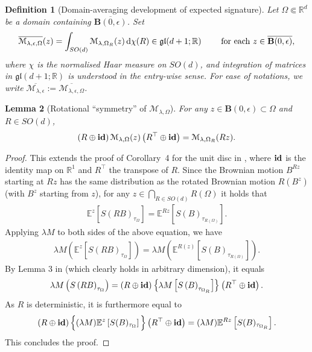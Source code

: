 \documentclass[11pt,a4paper,english,reqno]{amsart}
\theoremstyle{plain}
\newtheorem{definition}{Definition}[section]
\newtheorem{lemma}[definition]{Lemma}
\newcommand{\R}{\mathbb{R}}
\newcommand{\dd}{{\rm d}}
\newcommand{\e}{\epsilon}
\newcommand{\1}{\mathbbm{1}}
\newcommand{\B}{\mathbf{B}}
\begin{document}
\begin{definition}[Domain-averaging development of expected signature]\label{def: domain avg}
Let $\Omega\Subset \R^d$ be a domain containing $\overline{\B(0,\e)}$. Set
\begin{equation}\label{M avg}
\overline{\mathcal{M}_{\lambda,\e,\Omega}}(z) = \int_{SO(d)}\mathcal{M}_{\lambda, \Omega_{R}}(z) \,\dd\chi(R) \in \mathfrak{gl}(d+1;\R)\qquad \text{ for each } z \in \overline{\B(0,\e)},
\end{equation}
where $\chi$ is the normalised Haar measure on $SO(d)$, and integration of matrices in $\mathfrak{gl}(d+1;\R)$ is understood in the entry-wise sense. For ease of notations, we write $\overline{\mathcal{M}_{\lambda,\e}} := \overline{\mathcal{M}_{\lambda,\e,\Omega}}$.
\end{definition}



\begin{lemma}[Rotational ``symmetry'' of $\mathcal{M}_{\lambda,\Omega}$]
For any $z \in \B(0, \e)\subset \Omega$ and $R \in SO(d)$,
\begin{eqnarray}
\left(R \oplus  {\bf id}\right) \mathcal{M}_{\lambda, \Omega}(z)\left(R^{\top} \oplus {\bf id}\right) =  \mathcal{M}_{\lambda, \Omega_{R}}(Rz). \label{B}
\end{eqnarray}
\end{lemma}
\begin{proof}
This extends the proof of Corollary~4 for the unit disc in \cite{boedihardjo2021expected}, where ${\bf id}$ is the identity map on $\R^1$ and $R^\top$ the transpose of $R$. Since the Brownian motion $B^{Rz}$
starting at $Rz$ has the same distribution as the rotated Brownian motion $R (B^{z})$ (with $B^z$ starting from $z$), for any $z \in \bigcap_{R\in SO(d)}R(\Omega)$ it holds that 
\begin{eqnarray*}
\mathbb{E}^{z}\left[S\left(RB\right)_{\tau_{\Omega}}\right]= \mathbb{E}^{Rz}\left[S(B)_{\tau_{R(\Omega)}}\right].\label{A}
\end{eqnarray*}
Applying $\lambda M$ to both sides of the above equation, we have
\begin{eqnarray*}
\lambda M \left(\mathbb{E}^{z}\left[S\left(RB\right)_{\tau_{\Omega}}\right]\right) = \lambda M\left( \mathbb{E}^{R(z)}\left[S(B)_{\tau_{R(\Omega)}}\right]\right).
\end{eqnarray*}
By Lemma 3 in \cite{boedihardjo2021expected} (which clearly holds in arbitrary dimension), it equals
\begin{eqnarray*}
\lambda M \left(S\left(RB\right)_{\tau_{\Omega}}\right)= \left(R \oplus  {\bf id}\right)\left\{ \lambda M\left[S\left(B\right)_{\tau_{\Omega_R}}\right]\right\} \left(R^{\top} \oplus {\bf id}\right).
\end{eqnarray*}
As $R$ is deterministic, it is furthermore equal to 
\begin{eqnarray*}
\left(R \oplus  {\bf id}\right) \Big\{(\lambda M)\mathbb{E}^{z}\left[S(B)_{\tau_{\Omega}}\right]\Big\}\left(R^{\top} \oplus {\bf id}\right) =  (\lambda M)\mathbb{E}^{Rz}\left[S(B)_{\tau_{\Omega_{R}}}\right]. 
\end{eqnarray*}
This concludes the proof.
\end{proof}
\end{document}
